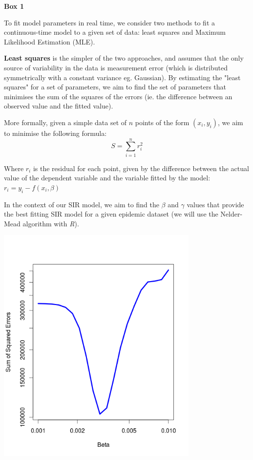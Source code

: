 \documentclass[11pt, a4paper, oneside,titlepage]{article}
\begin{document}
\newpage
\begin{framed}
{\begin{center}{\bf Box 1}\end{center}}
To fit model parameters in real time, we consider two methods to fit a continuous-time model to a given set of data: least squares and Maximum Likelihood Estimation (MLE).

{\bf Least squares} is the simpler of the two approaches, and assumes that the only source of variability in the data is measurement error (which is distributed symmetrically with a constant variance eg. Gaussian). By estimating the "least squares" for a set of parameters, we aim to find the set of parameters that minimises the sum of the squares of the errors (ie. the difference between an observed value and the fitted value). 

More formally, given a simple data set of $n$ points of the form $(x_i, y_i)$, we aim to minimise the following formula:
\begin{equation*}
S = \sum\limits_{i=1}^n r_{i}^2
\end{equation*}

Where $r_i$ is the residual for each point, given by the difference between the actual value of the dependent variable and the variable fitted by the model: $r_i = y_i - f(x_i, \beta)$

In the context of our SIR model, we aim to find the $\beta$ and $\gamma$ values that provide the best fitting SIR model for a given epidemic dataset (we will use the Nelder-Mead algorithm with \emph{R}).\cite{marily2013}

{\begin{center} \includegraphics[width=100mm]{sse.png}\end{center}}


\end{framed}
\end{document}
